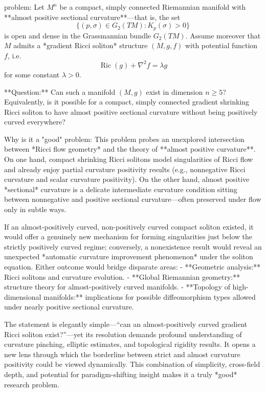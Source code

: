 problem:  
Let \( M^{n} \) be a compact, simply connected Riemannian manifold with **almost positive sectional curvature**—that is, the set  
\[
\{(p,\sigma) \in G_2(TM) : K_p(\sigma) > 0\}
\]
is open and dense in the Grassmannian bundle \( G_2(TM) \). Assume moreover that \( M \) admits a *gradient Ricci soliton* structure \((M,g,f)\) with potential function \(f\), i.e.  
\[
\operatorname{Ric}(g) + \nabla^2 f = \lambda g
\]
for some constant \( \lambda > 0 \).  

**Question:**  
Can such a manifold \( (M,g) \) exist in dimension \( n \ge 5 \)?  
Equivalently, is it possible for a compact, simply connected gradient shrinking Ricci soliton to have almost positive sectional curvature without being positively curved everywhere?  

Why is it a "good" problem:  
This problem probes an unexplored intersection between *Ricci flow geometry* and the theory of **almost positive curvature**. On one hand, compact shrinking Ricci solitons model singularities of Ricci flow and already enjoy partial curvature positivity results (e.g., nonnegative Ricci curvature and scalar curvature positivity). On the other hand, almost positive *sectional* curvature is a delicate intermediate curvature condition sitting between nonnegative and positive sectional curvature—often preserved under flow only in subtle ways.  

If an almost-positively curved, non-positively curved compact soliton existed, it would offer a genuinely new mechanism for forming singularities just below the strictly positively curved regime; conversely, a nonexistence result would reveal an unexpected *automatic curvature improvement phenomenon* under the soliton equation. Either outcome would bridge disparate areas:  
- **Geometric analysis:** Ricci solitons and curvature evolution.  
- **Global Riemannian geometry:** structure theory for almost-positively curved manifolds.  
- **Topology of high-dimensional manifolds:** implications for possible diffeomorphism types allowed under nearly positive sectional curvature.  

The statement is elegantly simple—“can an almost-positively curved gradient Ricci soliton exist?”—yet its resolution demands profound understanding of curvature pinching, elliptic estimates, and topological rigidity results. It opens a new lens through which the borderline between strict and almost curvature positivity could be viewed dynamically. This combination of simplicity, cross-field depth, and potential for paradigm-shifting insight makes it a truly *good* research problem.